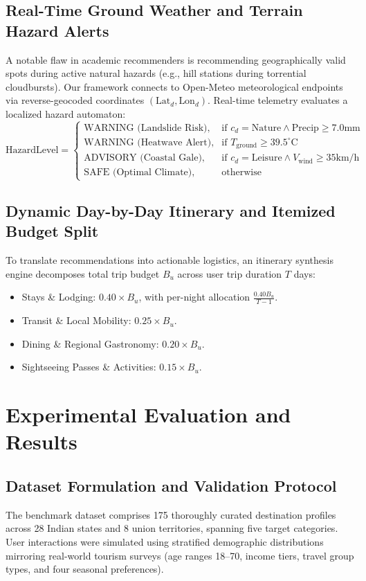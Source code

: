 \documentclass[conference]{IEEEtran}
\begin{document}
\subsection{Real-Time Ground Weather and Terrain Hazard Alerts}
A notable flaw in academic recommenders is recommending geographically valid spots during active natural hazards (e.g., hill stations during torrential cloudbursts). Our framework connects to Open-Meteo meteorological endpoints \cite{zippenfenig2023openmeteo} via reverse-geocoded coordinates $(\text{Lat}_d, \text{Lon}_d)$. Real-time telemetry evaluates a localized hazard automaton:
\begin{equation}
\text{HazardLevel} = 
\begin{cases}
\text{WARNING (Landslide Risk)}, & \text{if } c_d = \text{Nature} \land \text{Precip} \ge 7.0\text{mm} \\
\text{WARNING (Heatwave Alert)}, & \text{if } T_{\text{ground}} \ge 39.5^\circ\text{C} \\
\text{ADVISORY (Coastal Gale)}, & \text{if } c_d = \text{Leisure} \land V_{\text{wind}} \ge 35\text{km/h} \\
\text{SAFE (Optimal Climate)}, & \text{otherwise}
\end{cases}
\end{equation}

\subsection{Dynamic Day-by-Day Itinerary and Itemized Budget Split}
To translate recommendations into actionable logistics, an itinerary synthesis engine decomposes total trip budget $B_u$ across user trip duration $T$ days:
\begin{itemize}
    \item Stays \& Lodging: $0.40 \times B_u$, with per-night allocation $\frac{0.40 B_u}{T-1}$.
    \item Transit \& Local Mobility: $0.25 \times B_u$.
    \item Dining \& Regional Gastronomy: $0.20 \times B_u$.
    \item Sightseeing Passes \& Activities: $0.15 \times B_u$.
\end{itemize}

\section{Experimental Evaluation and Results}
\subsection{Dataset Formulation and Validation Protocol}
The benchmark dataset comprises 175 thoroughly curated destination profiles across 28 Indian states and 8 union territories, spanning five target categories. User interactions were simulated using stratified demographic distributions mirroring real-world tourism surveys (age ranges 18--70, income tiers, travel group types, and four seasonal preferences).
\end{document}
